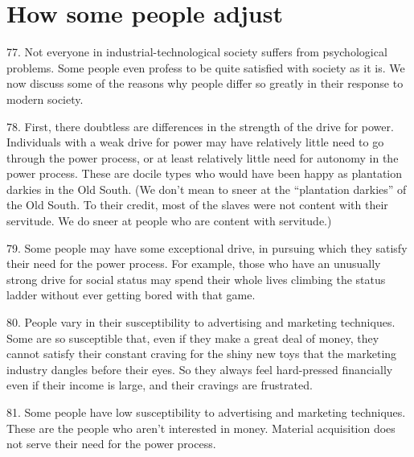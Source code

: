 \documentclass{article}
\begin{document}
\section{How some people adjust}

\hspace{0.5cm} 77.  Not everyone in industrial-technological society suffers from psychological problems.  Some 
people even profess to be quite satisfied with society as it is.  We now discuss some of the reasons 
why people differ so greatly in their response to modern society. \vspace{\baselineskip}

78.  First, there doubtless are differences in the strength of the drive for power.  Individuals with a 
weak drive for power may have relatively little need to go through the power process, or at least 
relatively little need for autonomy in the power process.  These are docile types who would have 
been  happy  as  plantation  darkies  in  the  Old  South.   (We  don’t  mean  to  sneer  at  the  “plantation  
darkies”  of  the  Old  South.   To  their  credit,  most  of  the  slaves  were  not  content  with  their  
servitude.  We do sneer at people who are content with servitude.) \vspace{\baselineskip}

79.  Some people may have some exceptional drive, in pursuing which they satisfy their need for 
the power process.  For example, those who have an unusually strong drive for social status may 
spend their whole lives climbing the status ladder without ever getting bored with that game. \vspace{\baselineskip} 

80.  People  vary  in  their  susceptibility  to  advertising  and  marketing  techniques.   Some  are  so  
susceptible that, even if they make a great deal of money, they cannot satisfy their constant craving 
for the shiny new toys that the marketing industry dangles before their eyes.  So they always feel 
hard-pressed financially even if their income is large, and their cravings are frustrated. \vspace{\baselineskip}

81.  Some people have low susceptibility to advertising and marketing techniques.  These are the 
people  who  aren’t  interested  in  money.   Material  acquisition  does  not  serve  their  need  for  the 
power process. \vspace{\baselineskip}
\end{document}

